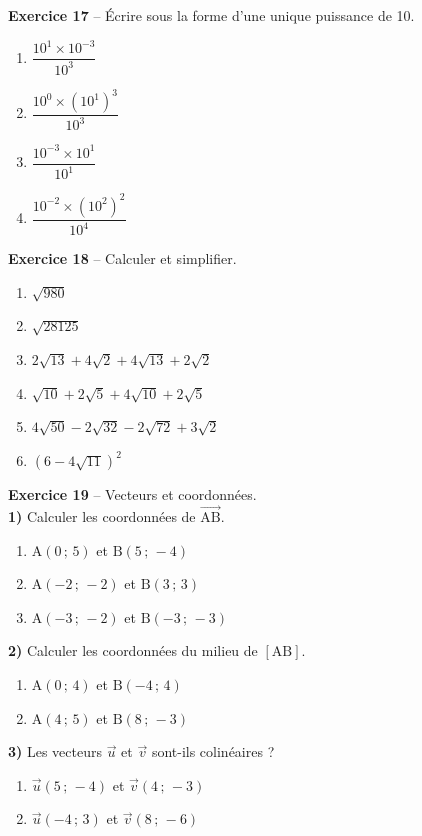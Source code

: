 \documentclass[12pt,a4paper,french]{article}
\begin{document}
\noindent\textbf{Exercice 17} -- Écrire sous la forme d'une unique puissance de 10.
\begin{enumerate}
\item $\dfrac{10^{1} \times 10^{-3}}{10^{3}}$
\item $\dfrac{10^{0} \times (10^{1})^{3}}{10^{3}}$
\item $\dfrac{10^{-3} \times 10^{1}}{10^{1}}$
\item $\dfrac{10^{-2} \times (10^{2})^{2}}{10^{4}}$
\end{enumerate}
\bigskip

\noindent\textbf{Exercice 18} -- Calculer et simplifier.
\begin{enumerate}
\item $\sqrt{980}$
\item $\sqrt{28125}$
\item $2\sqrt{13} + 4\sqrt{2} + 4\sqrt{13} + 2\sqrt{2}$
\item $\sqrt{10} + 2\sqrt{5} + 4\sqrt{10} + 2\sqrt{5}$
\item $4\sqrt{50} - 2\sqrt{32} - 2\sqrt{72} + 3\sqrt{2}$
\item $(6 - 4\sqrt{11})^2$
\end{enumerate}
\bigskip

\noindent\textbf{Exercice 19} -- Vecteurs et coordonnées.\\
\medskip
\noindent\textbf{1)} Calculer les coordonnées de $\overrightarrow{\ensuremath{\mathrm{A}}\ensuremath{\mathrm{B}}}$.
\begin{enumerate}
\item $\ensuremath{\mathrm{A}}(0\,;\,5)$ et $\ensuremath{\mathrm{B}}(5\,;\,-4)$
\item $\ensuremath{\mathrm{A}}(-2\,;\,-2)$ et $\ensuremath{\mathrm{B}}(3\,;\,3)$
\item $\ensuremath{\mathrm{A}}(-3\,;\,-2)$ et $\ensuremath{\mathrm{B}}(-3\,;\,-3)$
\end{enumerate}
\medskip
\noindent\textbf{2)} Calculer les coordonnées du milieu de $[\ensuremath{\mathrm{A}}\ensuremath{\mathrm{B}}]$.
\begin{enumerate}
\item $\ensuremath{\mathrm{A}}(0\,;\,4)$ et $\ensuremath{\mathrm{B}}(-4\,;\,4)$
\item $\ensuremath{\mathrm{A}}(4\,;\,5)$ et $\ensuremath{\mathrm{B}}(8\,;\,-3)$
\end{enumerate}
\medskip
\noindent\textbf{3)} Les vecteurs $\vec{u}$ et $\vec{v}$ sont-ils colinéaires ?
\begin{enumerate}
\item $\vec{u}(5\,;\,-4)$ et $\vec{v}(4\,;\,-3)$
\item $\vec{u}(-4\,;\,3)$ et $\vec{v}(8\,;\,-6)$
\end{enumerate}
\bigskip
\end{document}
